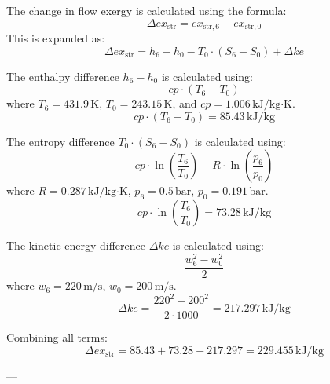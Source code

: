 The change in flow exergy is calculated using the formula:  
\[
\Delta ex_{\text{str}} = ex_{\text{str},6} - ex_{\text{str},0}
\]  
This is expanded as:  
\[
\Delta ex_{\text{str}} = h_6 - h_0 - T_0 \cdot (S_6 - S_0) + \Delta ke
\]  

The enthalpy difference \( h_6 - h_0 \) is calculated using:  
\[
cp \cdot (T_6 - T_0)
\]  
where \( T_6 = 431.9 \, \text{K} \), \( T_0 = 243.15 \, \text{K} \), and \( cp = 1.006 \, \text{kJ/kg·K} \).  
\[
cp \cdot (T_6 - T_0) = 85.43 \, \text{kJ/kg}
\]  

The entropy difference \( T_0 \cdot (S_6 - S_0) \) is calculated using:  
\[
cp \cdot \ln\left(\frac{T_6}{T_0}\right) - R \cdot \ln\left(\frac{p_6}{p_0}\right)
\]  
where \( R = 0.287 \, \text{kJ/kg·K} \), \( p_6 = 0.5 \, \text{bar} \), \( p_0 = 0.191 \, \text{bar} \).  
\[
cp \cdot \ln\left(\frac{T_6}{T_0}\right) = 73.28 \, \text{kJ/kg}
\]  

The kinetic energy difference \( \Delta ke \) is calculated using:  
\[
\frac{w_6^2 - w_0^2}{2}
\]  
where \( w_6 = 220 \, \text{m/s} \), \( w_0 = 200 \, \text{m/s} \).  
\[
\Delta ke = \frac{220^2 - 200^2}{2 \cdot 1000} = 217.297 \, \text{kJ/kg}
\]  

Combining all terms:  
\[
\Delta ex_{\text{str}} = 85.43 + 73.28 + 217.297 = 229.455 \, \text{kJ/kg}
\]  

---